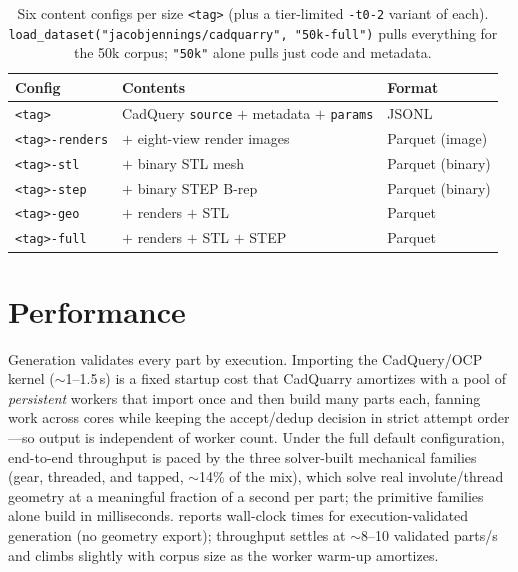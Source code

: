 \documentclass[11pt]{article}
\newcommand{\code}[1]{\texttt{#1}}
\newcommand{\fm}[1]{\textsf{\small #1}}
\begin{document}
\begin{table}[h]
\centering\small\setlength{\tabcolsep}{6pt}
\renewcommand{\arraystretch}{1.12}
\begin{tabularx}{\linewidth}{@{}l X l@{}}
\toprule
\textbf{Config} & \textbf{Contents} & \textbf{Format}\\
\midrule
\code{<tag>}          & CadQuery \code{source} $+$ metadata $+$ \code{params} & JSONL\\
\code{<tag>-renders}  & $+$ eight-view render images                          & Parquet (image)\\
\code{<tag>-stl}      & $+$ binary STL mesh                                   & Parquet (binary)\\
\code{<tag>-step}     & $+$ binary STEP B-rep                                 & Parquet (binary)\\
\code{<tag>-geo}      & $+$ renders $+$ STL                                   & Parquet\\
\code{<tag>-full}     & $+$ renders $+$ STL $+$ STEP                          & Parquet\\
\bottomrule
\end{tabularx}
\caption{Six content configs per size \code{<tag>} (plus a tier-limited
\code{-t0-2} variant of each). \code{load\_dataset("jacobjennings/cadquarry",
"50k-full")} pulls everything for the 50k corpus; \code{"50k"} alone pulls just
code and metadata.}
\label{tab:configs}
\end{table}

\section{Performance}\label{sec:perf}
Generation validates every part by execution. Importing
the CadQuery/OCP kernel ($\sim$1--1.5\,s) is a fixed startup cost that CadQuarry
amortizes with a pool of \emph{persistent} workers that import once and then
build many parts each, fanning work across cores while keeping the
accept/dedup decision in strict attempt order---so output is independent of
worker count. Under the full default configuration, end-to-end throughput is
paced by the three solver-built mechanical families (\fm{gear}, \fm{threaded},
and \fm{tapped}, $\sim$14\% of the mix), which solve real involute/thread
geometry at a meaningful fraction of a second per part; the primitive families
alone build in milliseconds.  reports wall-clock times for
execution-validated generation (no geometry export); throughput settles at
$\sim$8--10 validated parts/s and climbs slightly with corpus size as the worker
warm-up amortizes.
\end{document}
